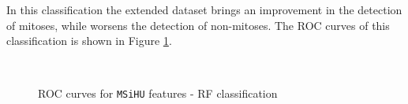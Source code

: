 In this classification the extended dataset brings an improvement in the detection of mitoses, while worsens the detection of non-mitoses.
The \Gls{ROC} curves of this classification is shown in Figure \ref{ch6:fig4}.

\begin{figure}[!htb]
  \centering
    \hspace{1mm}
    \\
    \hspace{1mm}
    \caption{ROC curves for \texttt{MSiHU} features - RF classification}
    \label{ch6:fig4}
\end{figure}


